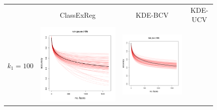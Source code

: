 \documentclass[twoside,11pt]{article}
\newenvironment{myfont}{\fontfamily{phv}\selectfont}{\par}
\begin{document}
\begin{figure}[t]
\centering
\begin{tabular}{cccc}
&
\begin{myfont}ClassExReg\end{myfont} &
\begin{myfont}KDE-BCV\end{myfont} &
\begin{myfont}KDE-UCV\end{myfont}\\
\begin{myfont}$k_1 = 100$\end{myfont} &
\includegraphics[scale = 0.2, clip = true, trim = 0 0 0 0.6in, valign=c]{repeat_100_r_cv_gauss.png} &
\includegraphics[scale = 0.2, clip = true, trim = 0 0 0 0.6in, valign=c]{repeat_100_kde_bcv.png} &

\end{tabular}
\end{figure}
\end{document}
